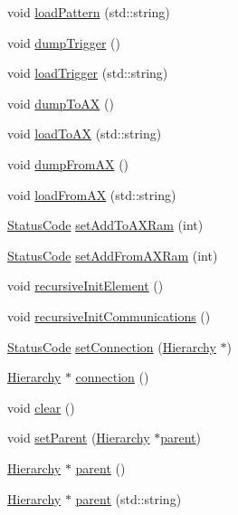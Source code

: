 \begin{DoxyCompactItemize}
\item 
void \hyperlink{classA3PE_a522cba0a4d976eec59222504af188fb2}{load\+Pattern} (std\+::string)
\item 
void \hyperlink{classA3PE_aeab7701d0d1f6fd910e952b631769d42}{dump\+Trigger} ()
\item 
void \hyperlink{classA3PE_a34a9499a0d9065a1b5772880d7e8d5c4}{load\+Trigger} (std\+::string)
\item 
void \hyperlink{classA3PE_ad6b6f1ae4ac23e6d0827eee8cc2c98e4}{dump\+To\+AX} ()
\item 
void \hyperlink{classA3PE_a40017b4138705690f8b04e336a7ffcdf}{load\+To\+AX} (std\+::string)
\item 
void \hyperlink{classA3PE_a60a510251ec2b5fd800af2ba88e9fdac}{dump\+From\+AX} ()
\item 
void \hyperlink{classA3PE_a65235f7d42e8f7fb6056f5629545d2aa}{load\+From\+AX} (std\+::string)
\item 
\hyperlink{classStatusCode}{Status\+Code} \hyperlink{classA3PE_a54fe4da570ea8833fe2c981de1085387}{set\+Add\+To\+A\+X\+Ram} (int)
\item 
\hyperlink{classStatusCode}{Status\+Code} \hyperlink{classA3PE_a834fde5951d2c1bf6b41842520360fce}{set\+Add\+From\+A\+X\+Ram} (int)
\item 
void \hyperlink{classElement_a3c0abcb36f8906688bb7e32608df7086}{recursive\+Init\+Element} ()
\item 
void \hyperlink{classElement_a82119ed37dff76508a2746a853ec35ba}{recursive\+Init\+Communications} ()
\item 
\hyperlink{classStatusCode}{Status\+Code} \hyperlink{classElement_ab476b4b1df5954141ceb14f072433b89}{set\+Connection} (\hyperlink{classHierarchy}{Hierarchy} $\ast$)
\item 
\hyperlink{classHierarchy}{Hierarchy} $\ast$ \hyperlink{classElement_af57444353c1ddf9fa0109801e97debf7}{connection} ()
\item 
void \hyperlink{classHierarchy_af4d43b0765b402670eed2d62c73405af}{clear} ()
\item 
void \hyperlink{classHierarchy_a585ad1aeec16077a0e532ab8b4fc557b}{set\+Parent} (\hyperlink{classHierarchy}{Hierarchy} $\ast$\hyperlink{classHierarchy_a1c7bec8257e717f9c1465e06ebf845fc}{parent})
\item 
\hyperlink{classHierarchy}{Hierarchy} $\ast$ \hyperlink{classHierarchy_a1c7bec8257e717f9c1465e06ebf845fc}{parent} ()
\item 
\hyperlink{classHierarchy}{Hierarchy} $\ast$ \hyperlink{classHierarchy_ad550588733bf75ac5c0fcfd7c8fd11a6}{parent} (std\+::string)

\end{DoxyCompactItemize}

